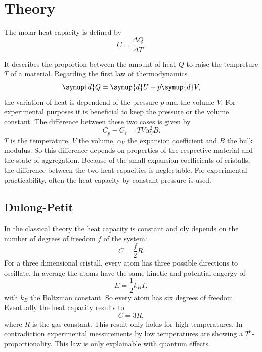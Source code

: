 \section{Theory}
\label{sec:Theorie}

The molar heat capacity is defined by 
\begin{equation}
    C = \frac{\Delta Q}{\Delta T}.
\end{equation}

It describes the proportion between the amount of heat $Q$ to raise the tempreture $T$ of a material. 
Regarding the first law of thermodynamics
\begin{equation}
    \symup{d}Q = \symup{d}U+p\symup{d}V,
\end{equation}
the variation of heat is dependend of the pressure $p$ and the volume $V$.
For experimental purposes it is beneficial to keep the pressure or the volume constant.
The difference between these two cases is given by
\begin{equation}
    C_p - C_V = TV \alpha_V^2 B.
\end{equation}
$T$ is the temperature, $V$ the volume, $\alpha_V$ the expansion coefficient and $B$ the bulk modulus.
So this difference depends on properties of the respective material and the state of aggregation. 
Because of the small expansion coefficients of cristalls, the difference between the two heat capacities is neglectable.
For experimental practicability, often the heat capacity by constant pressure is used.


\subsection{Dulong-Petit}
In the classical theory the heat capacity is constant and oly depends on the number of degrees of freedom $f$ of the system:
\begin{equation}
    C = \frac{f}{2} R.
\end{equation} 
For a three dimensional cristall, every atom has three possible directions to oscillate. 
In average the atoms have the same kinetic and potential engergy of 
\begin{equation}
    E = \frac{1}{2}k_B T,
\end{equation}
with $k_B$ the Boltzman constant.
So every atom has six degrees of freedom. 
Eventually the heat capacity results to
\begin{equation}
    C = 3 R,
\end{equation}
where $R$ is the gas constant.
This result only holds for high temperatures. 
In contradiction experimental messurements by low temperatures are showing a $T^3$-proportionality.
This law is only explainable with quantum effects.

